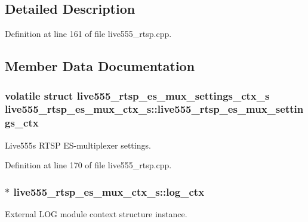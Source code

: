 \subsection{Detailed Description}


Definition at line 161 of file live555\+\_\+rtsp.\+cpp.



\subsection{Member Data Documentation}
\subsubsection[{\texorpdfstring{live555\+\_\+rtsp\+\_\+es\+\_\+mux\+\_\+settings\+\_\+ctx}{live555_rtsp_es_mux_settings_ctx}}]{\setlength{\rightskip}{0pt plus 5cm}volatile struct {\bf live555\+\_\+rtsp\+\_\+es\+\_\+mux\+\_\+settings\+\_\+ctx\+\_\+s} live555\+\_\+rtsp\+\_\+es\+\_\+mux\+\_\+ctx\+\_\+s\+::live555\+\_\+rtsp\+\_\+es\+\_\+mux\+\_\+settings\+\_\+ctx}\hypertarget{structlive555__rtsp__es__mux__ctx__s_aad4b5b5b7f6728e513332025cdb5ad84}{}\label{structlive555__rtsp__es__mux__ctx__s_aad4b5b5b7f6728e513332025cdb5ad84}
Live555\textquotesingle{}s R\+T\+SP E\+S-\/multiplexer settings. 

Definition at line 170 of file live555\+\_\+rtsp.\+cpp.

\subsubsection[{\texorpdfstring{log\+\_\+ctx}{log_ctx}}]{$\ast$ live555\+\_\+rtsp\+\_\+es\+\_\+mux\+\_\+ctx\+\_\+s\+::log\+\_\+ctx}\hypertarget{structlive555__rtsp__es__mux__ctx__s_a17b61ccf1a42eee4efba9cc593c99a5d}{}\label{structlive555__rtsp__es__mux__ctx__s_a17b61ccf1a42eee4efba9cc593c99a5d}
External L\+OG module context structure instance. 

